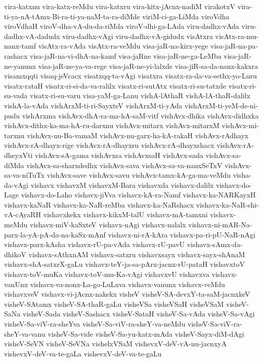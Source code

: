 {vira-katxnu
vira-katx-reMdu
vira-katxru
vira-kitx-jAcnx-nadiM
virakotxV
vira-ti-ya-nA-tAmx-Bi-ra-ti-ya-naM-ta-ra-diMde
viriM-ci-ga-LiMda
viroVdha
viroVdhaH
viroV-dha-vA-du-da-riMda
viroV-dhi-ga-LAda
viru-dadhx-vAda
viru-dadhx-vA-dadudx
viru-dadhx-vAgi
viru-dadhx-vA-gidudx
visAtxra
visAtx-ra-mu-nanx-tamf
visAtx-ra-vAda
visAtx-ra-veMdu
visa-jaR-na-kirx-yege
visa-jaR-na-pa-rashacx
visa-jaR-na-vi-dhA-na-kamf
visa-jaRne
visa-jaR-ne-ga-LeMba
visa-jaR-ne-yanunx
visa-jaR-ne-ya-va-rege
visa-jaR-ne-yi-lalxde
visa-jiR-sa-da-nanx-kakxra
visamxqqti
visaq-jeVcacx
visatxqq-ta-vAgi
visatxra
visatx-ra-da-va-sethx-yo-Luru
visatx-rataH
visatx-ri-si-da-va-ralilx
visatx-ri-sutAtx
visatx-ri-su-tatxde
visatx-ri-su-vada
visatx-ri-su-varu
visa-yaM-ga-Lanu
vishA-lAthaR
vishA-lA-thaR-dalilx
vishA-la-vAda
vishArxM-ti-ri-SayxteV
vishArxM-ti-yAda
vishArxM-ti-yeM-de-ni-pudu
vishArxma
vishAvx-dhA-ra-ma-hA-saM-vitf
vishAvx-dhika
vishAvx-didhxka
vishAvx-dithx-ka-ma-hA-ru-darxnu
vishAvx-mitarx
vishAvx-mitarxM
vishAvx-mi-tarxnu
vishAvx-nu-Ba-vamaM
vishAvx-nu-garx-ha-kA-rakaH
vishAvx-rAdhayx
vishAvx-rA-dhayx-rige
vishAvx-rA-dhayxru
vishAvx-rA-dhayxshacx
vishAvx-rA-dheyxVti
vishAvx-sA-gama
vishAvxsa
vishAvxsaH
vishAvx-sada
vishAvx-sa-diMda
vishAvx-sa-sharxdedhx
vishAvx-sava
vishAvx-sa-va-nanxSeTxV
vishAvx-sa-va-niTuTx
vishAvx-save
vishAvx-savu
vishAvx-tamx-kA-ga-ma-veMdu
visha-da-vAgi
vishavx
vishavxM
vishavxM-Bara
vishavxda
vishavx-dalilx
vishavx-do-Lage
vishavx-do-Laho
vishavx-jiVva
vishavx-kA-ra-Namf
vishavx-ka-NARKayxH
vishavx-kaNaR
vishavx-ka-NaR-reMba
vishavx-ka-NaRshacx
vishavx-ka-NaR-shi-vA-cAyaRH
vishavxkekx
vishavx-kikxM-talU
vishavx-mA-tamxni
vishavx-meMdu
vishavx-miV-kaSxteV
vishavx-nAgi
vishavx-nalalx
vishavx-ni-mAR-Na-parx-la-yA-pA-da-na-kaSx-mAnf
vishavx-ni-rA-kAra
vishavx-pa-ri-pU-NaR-nAgi
vishavx-parx-kAsha
vishavx-rU-pa-vAda
vishavx-rU-pavU
vishavx-sAmx-da-dhikoV
vishavx-sAthxnAM
vishavx-satxru
vishavxsayx
vishavx-sayx-shAnaM
vishavx-shA-satxrX-gaLu
vishavx-teY-ja-sa-pArx-jacnx-rU-pataH
vishavxtoV
vishavx-toV-muKa
vishavx-toV-mu-Ka-vAgi
vishavxvU
vishavxva
vishavx-vanUnx
vishavx-va-nonx-La-go-LuLxva
vishavx-vanunx
vishavx-veMdu
vishavxveV
vishavx-vi-jAcnx-nakekx
visheV
visheV-SA-devxY-ta-saM-jacnxkeV
visheV-SAtamx
visheV-SA-thaR-gaLu
visheVSa
visheVSaH
visheVSaM
visheV-SaNa
visheV-Sada
visheV-Sashacx
visheV-SataH
visheV-Sa-vAda
visheV-Sa-vAgi
visheV-Sa-viV-ra-sheYva
visheV-Sa-viV-ra-sheY-va-neMdu
visheV-Sa-viV-ra-sheY-va-vanu
visheV-Sa-vide
visheV-Sa-yu-katx-mAda
visheV-Sayx-diM-dAgi
visheV-SeVN
visheV-SeVNa
vishelxVSaM
vishevxV-deV-vA-nu-jacnxyA
vishevxV-deV-va-te-gaLa
vishevxV-deV-va-te-gaLu
}
